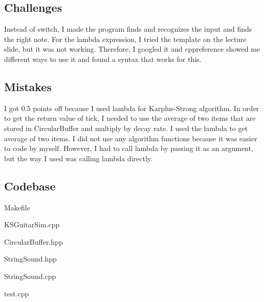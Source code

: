 \subsection{Challenges}\label{sec:ps4b:challenges}

Instead of switch, I made the program finds and recognizes the input and finds the right note.
For the lambda expression, I tried the template on the lecture slide, but it was not working. Therefore, I googled it and cppreference showed me different ways to use it and found a syntax that works for this.

\subsection{Mistakes}\label{sec:ps4b:Mistakes}

I got 0.5 points off because I used lambda for Karplus-Strong algorithm. In order to get the return value of tick, I needed to use the average of two items that are stored in CircularBuffer and multiply by decay rate. I used the lambda to get average of two items. I did not use any algorithm functions because it was easier to code by myself. However, I had to call lambda by passing it as an argument, but the way I used was calling lambda directly.

\subsection{Codebase}\label{sec:ps4b:code}
Makefile

KSGuitarSim.cpp

CircularBuffer.hpp

StringSound.hpp

StringSound.cpp

test.cpp


\newpage
